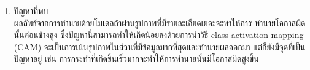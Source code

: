 \begin{enumerate}
\begin{enumerate}
\begin{enumerate}
		\end{enumerate}
	\end{enumerate}
	\clearpage
	\item {ปัญหาที่พบ}\\
	ผลลัพธ์จากการทำนายด้วยโมเดลถ้าผ่านรูปภาพที่มีรายละเอียดเยอะจะทำให้การ ทำนายโอกาสผิดนั้นค่อนข้างสูง ซึ่งปัญหานี่สามารถทำให้เกิดน้อยลงด้วยการนำวิธี 
	class activation mapping (CAM) จะเป็นการเน้นรูปภาพในส่วนที่มีข้อมูลมากที่สุดและทำนายผลออกมา แต่ก็ยังมีจุดที่เป็นปัญหาอยู่ เช่น 
	การกระทำที่เกิดขึ้นเร็วมากจะทำให้การทำนายนั้นมีโอกาสผิดสูงขึ้น
\end{enumerate}		